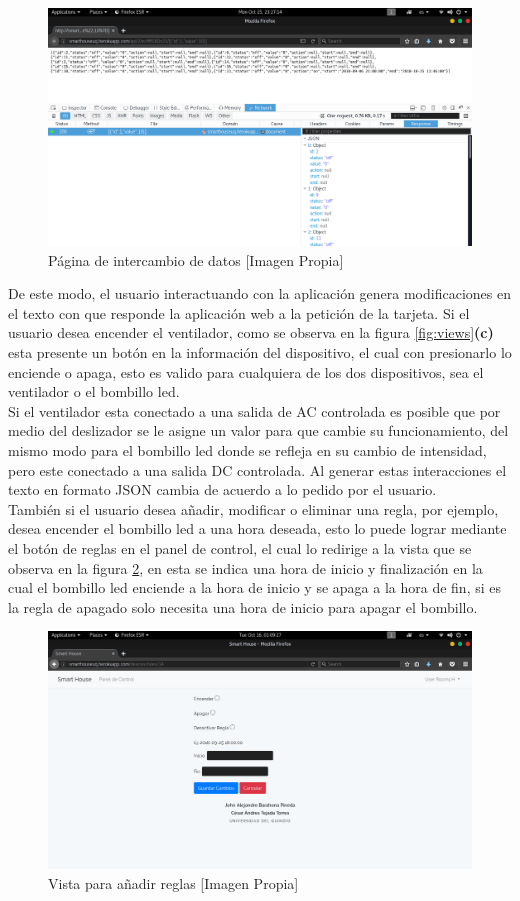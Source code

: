 \begin{figure}[H]
	\centering
	\caption{Página de intercambio de datos [Imagen Propia]}
	\label{fig:updateview}
	\includegraphics[width=0.7\linewidth]{Imagenes/Update_view}
\end{figure}

De este modo, el usuario interactuando con la aplicación genera modificaciones en el texto con que responde la aplicación web a la petición de la tarjeta. Si el usuario desea encender el ventilador, como se observa en la figura \ref{fig:views}\textbf{(c)} esta presente un botón en la información del dispositivo, el cual con presionarlo lo enciende o apaga, esto es valido para cualquiera de los dos dispositivos, sea el ventilador o el bombillo led.\\

Si el ventilador esta conectado a una salida de AC controlada es posible que por medio del deslizador se le asigne un valor para que cambie su funcionamiento, del mismo modo para el bombillo led donde se refleja en su cambio de intensidad, pero este conectado a una salida DC controlada. Al generar estas interacciones el texto en formato JSON cambia de acuerdo a lo pedido por el usuario.\\ 

También si el usuario desea añadir, modificar o eliminar una regla, por ejemplo, desea encender el bombillo led a una hora deseada, esto lo puede lograr mediante el botón de reglas en el panel de control, el cual lo redirige a la vista que se observa en la figura \ref{fig:rulesview}, en esta se indica una hora de inicio y finalización en la cual el bombillo led enciende a la hora de inicio y se apaga a la hora de fin, si es la regla de apagado solo necesita una hora de inicio para apagar el bombillo.

\begin{figure}[H]
	\centering
	\caption{Vista para añadir reglas [Imagen Propia]}
	\label{fig:rulesview}
	\includegraphics[width=0.6\linewidth]{Imagenes/rules_view}
\end{figure}

